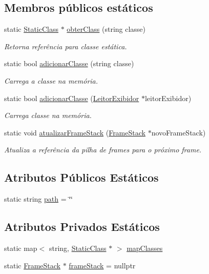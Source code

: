 \subsection*{Membros públicos estáticos}
\begin{DoxyCompactItemize}
\item 
static \hyperlink{classStaticClass}{Static\+Class} $\ast$ \hyperlink{classMethodArea_a6e9d922892887daadd4624729268094f}{obter\+Class} (string classe)
\begin{DoxyCompactList}\small\item\em Retorna referência para classe estática. \end{DoxyCompactList}\item 
static bool \hyperlink{classMethodArea_a30233142aefa26c17a3a222582cb56c1}{adicionar\+Classe} (string classe)
\begin{DoxyCompactList}\small\item\em Carrega a classe na memória. \end{DoxyCompactList}\item 
static bool \hyperlink{classMethodArea_af8c5a64c3e17fb33809b1cea9b85a8b1}{adicionar\+Classe} (\hyperlink{classLeitorExibidor}{Leitor\+Exibidor} $\ast$leitor\+Exibidor)
\begin{DoxyCompactList}\small\item\em Carrega classe na memória. \end{DoxyCompactList}\item 
static void \hyperlink{classMethodArea_ac6423e447a5f46bf969bfb7df7500a2b}{atualizar\+Frame\+Stack} (\hyperlink{classFrameStack}{Frame\+Stack} $\ast$novo\+Frame\+Stack)
\begin{DoxyCompactList}\small\item\em Atualiza a referência da pilha de frames para o próximo frame. \end{DoxyCompactList}\end{DoxyCompactItemize}
\subsection*{Atributos Públicos Estáticos}
\begin{DoxyCompactItemize}
\item 
static string \hyperlink{classMethodArea_a5fba57684c1552a65932306870b1130c}{path} = \char`\"{}\char`\"{}
\end{DoxyCompactItemize}
\subsection*{Atributos Privados Estáticos}
\begin{DoxyCompactItemize}
\item 
static map$<$ string, \hyperlink{classStaticClass}{Static\+Class} $\ast$ $>$ \hyperlink{classMethodArea_ab92a54586a58ca940ecedfcc90ff8b13}{map\+Classes}
\item 
static \hyperlink{classFrameStack}{Frame\+Stack} $\ast$ \hyperlink{classMethodArea_a2b99453f48cbcc141b027b8e6bbb9e2d}{frame\+Stack} = nullptr
\end{DoxyCompactItemize}


